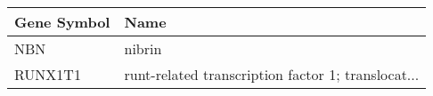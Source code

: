 \begin{tabular}{ll}
\toprule
Gene Symbol &                                               Name \\
\midrule
        NBN &                                             nibrin \\
    RUNX1T1 & runt-related transcription factor 1; translocat... \\
\bottomrule
\end{tabular}
